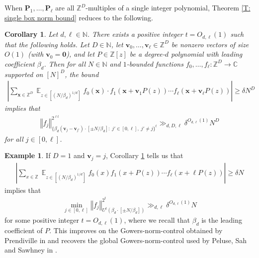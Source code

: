 \documentclass[11pt]{amsart}
\newtheorem{corollary}[lemma]{Corollary}
\theoremstyle{definition}
\newtheorem{example}[lemma]{Example} %
\DeclareMathOperator*{\E}{\mathbb{E}}
\newcommand{\C}{{\mathbb C}}
\newcommand{\N}{{\mathbb N}}
\newcommand{\Z}{{\mathbb Z}}
\newcommand{\p}{{\textbf{P}}}
\newcommand{\bv}{{\textbf{v}}}
\newcommand{\bx}{{\textbf{x}}}
\newcommand{\norm}[1]{\left\Vert #1\right\Vert}
\newcommand{\abs}[1]{\mathopen{}\left| #1\mathclose{}\right|}
\begin{document}
 
When $\p_1, \ldots, \p_\ell$ are all $\Z^D$-multiples of a single integer polynomial, Theorem \ref{T: single box norm bound} reduces to the following.
\begin{corollary}\label{C: main theorem, same polynomial}
Let $d, \ell \in \N$.  There exists a positive integer $t = O_{d, \ell}(1)$ such that the following holds. Let $D\in\N$, let $\bv_0, \ldots, \bv_\ell\in\Z^{{D}}$ be nonzero vectors of size $O(1)$ (with $\bv_0 = \mathbf{0}$), and let $P\in\Z[z]$ be a degree-$d$ polynomial with leading coefficient $\beta_d$. 
    Then for all $N\in\N$ and $1$-bounded functions $f_0, \ldots, f_\ell:\Z^D\to\C$ supported on $[N]^D$, the bound
    \begin{align*}
            \abs{\sum_{\bx\in\Z^D}\E_{z\in[(N/\beta_d)^{1/d}]}
            f_0(\bx)\cdot f_1(\bx+\bv_1 P(z))\cdots f_\ell(\bx+\bv_\ell P(z))} \geq \delta N^D
    \end{align*}
    implies that
    \begin{align*}
        \norm{f_j}_{\{\beta_d (\bv_j-\bv_{j'})\cdot[\pm N/\beta_d]:\; j'\in[0,\ell],\; j'\neq j\}^{ t}}^{2^{\ell t}}\gg_{d, D, \ell}\delta^{O_{d, \ell}(1)}N^{D}
    \end{align*}
    for all $j\in[0,\ell]$.
\end{corollary}
\begin{example}
    If $D=1$ and $\bv_j = j$, Corollary \ref{C: main theorem, same polynomial} tells us that
    \begin{align*}
        \abs{\sum_{x\in\Z}\E_{z\in[(N/\beta_d)^{1/d}]} f_0(x)f_1(x+P(z))\cdots f_\ell(x+\ell P(z))}\geq \delta N
    \end{align*}
    implies that
    \begin{align*}
        \min_{j\in[0,\ell]}\norm{f_j}^{2^t}_{U^t(\beta_d\cdot[\pm N/\beta_d])}\gg_{d, \ell}\delta^{O_{d,\ell}(1)}N
    \end{align*}
    for some positive integer $t=O_{d,\ell}(1)$, where we recall that $\beta_d$ is the leading coefficient of $P$. This improves on the Gowers-norm-control obtained by Prendiville in \cite{Pre17} and recovers the global Gowers-norm-control used by Peluse, Sah and Sawhney in \cite{PSS23}.
\end{example}
\end{document}
